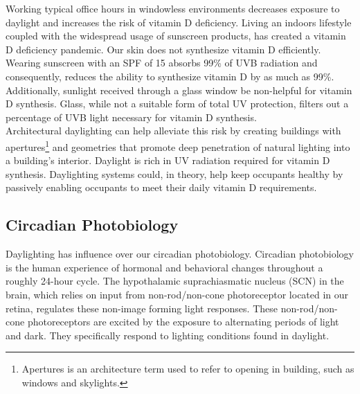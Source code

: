     Working typical office hours in windowless environments decreases exposure to daylight and increases the risk of vitamin D deficiency. Living an indoors lifestyle coupled with the widespread usage of sunscreen products, has created a vitamin D deficiency pandemic.  Our skin does not synthesize vitamin D efficiently. Wearing sunscreen with an SPF of 15 absorbs 99\% of UVB radiation and consequently, reduces the ability to synthesize vitamin D by as much as 99\%\cite{Holick}.
    Additionally, sunlight received through a glass window be non-helpful for vitamin D synthesis. Glass, while not a suitable form of total UV protection, filters out a percentage of UVB light\cite{tuchinda2006photoprotection} necessary for vitamin D synthesis. \\

    Architectural daylighting can help alleviate this risk by creating buildings with apertures\footnote{Apertures is an architecture term used to refer to opening in building, such as windows and skylights.} and geometries that promote deep penetration of natural lighting into a building's interior. Daylight is rich in UV radiation required for vitamin D synthesis.  Daylighting systems could, in theory, help keep occupants healthy by passively enabling occupants to meet their daily vitamin D requirements. \\

  \subsection{Circadian Photobiology}
    Daylighting has influence over our circadian photobiology. Circadian photobiology is the human experience of hormonal and behavioral changes throughout a roughly 24-hour cycle. The hypothalamic suprachiasmatic nucleus (SCN)  in the brain, which relies on input from non-rod/non-cone photoreceptor located in our retina, regulates these non-image forming light responses. These non-rod/non-cone photoreceptors are excited by the exposure to alternating periods of light and dark. They specifically respond to lighting conditions found in daylight\cite{Rea,Thapan}.\\

